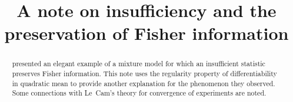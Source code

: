 \documentclass[aos]{imsart}
\theoremstyle{plain}
\theoremstyle{remark}
\begin{document}
\begin{frontmatter}
\title{A note on insufficiency and the preservation of Fisher information}

\begin{aug}
\author{
}



\address{Statistics Department\\
Yale University\\
New Haven, Connecticut\\
}

\end{aug}

\begin{abstract}
\citet{KaganShepp05AmStat} presented an elegant example of a mixture model  for which an insufficient statistic  preserves Fisher information.
This note uses the regularity property of differentiability in quadratic mean to provide another explanation for the phenomenon they observed. Some connections with Le~Cam's theory for convergence of experiments are noted. 
\end{abstract}

\begin{keyword}[class=AMS]
\end{keyword}

\begin{keyword}
\end{keyword}

\end{frontmatter}
\end{document}
